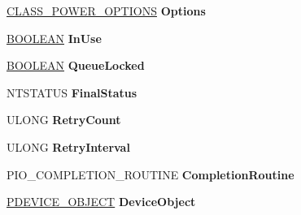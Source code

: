 \begin{DoxyCompactItemize}
\begin{tabbing}
\end{tabbing}\item 
\mbox{\label{struct___c_l_a_s_s___p_o_w_e_r___c_o_n_t_e_x_t_afaf59be046c6005396572ef83e4794f0}} 
\hyperlink{struct___c_l_a_s_s___p_o_w_e_r___o_p_t_i_o_n_s}{C\+L\+A\+S\+S\+\_\+\+P\+O\+W\+E\+R\+\_\+\+O\+P\+T\+I\+O\+NS} {\bfseries Options}
\item 
\mbox{\label{struct___c_l_a_s_s___p_o_w_e_r___c_o_n_t_e_x_t_acd952eab7209b941d56ceb97d26b5baf}} 
\hyperlink{_processor_bind_8h_a112e3146cb38b6ee95e64d85842e380a}{B\+O\+O\+L\+E\+AN} {\bfseries In\+Use}
\item 
\mbox{\label{struct___c_l_a_s_s___p_o_w_e_r___c_o_n_t_e_x_t_a098a4cbcfc9d5800363574cc6fcc1454}} 
\hyperlink{_processor_bind_8h_a112e3146cb38b6ee95e64d85842e380a}{B\+O\+O\+L\+E\+AN} {\bfseries Queue\+Locked}
\item 
\mbox{\label{struct___c_l_a_s_s___p_o_w_e_r___c_o_n_t_e_x_t_a44164694b69477785c0618208aaf9499}} 
N\+T\+S\+T\+A\+T\+US {\bfseries Final\+Status}
\item 
\mbox{\label{struct___c_l_a_s_s___p_o_w_e_r___c_o_n_t_e_x_t_ad751a7b058bc86027172581e7dd40cb5}} 
U\+L\+O\+NG {\bfseries Retry\+Count}
\item 
\mbox{\label{struct___c_l_a_s_s___p_o_w_e_r___c_o_n_t_e_x_t_ac1dde02502761b34bc40d90d5b324d00}} 
U\+L\+O\+NG {\bfseries Retry\+Interval}
\item 
\mbox{\label{struct___c_l_a_s_s___p_o_w_e_r___c_o_n_t_e_x_t_a44a602c36af1924702776b8987e7fa6c}} 
P\+I\+O\+\_\+\+C\+O\+M\+P\+L\+E\+T\+I\+O\+N\+\_\+\+R\+O\+U\+T\+I\+NE {\bfseries Completion\+Routine}
\item 
\mbox{\label{struct___c_l_a_s_s___p_o_w_e_r___c_o_n_t_e_x_t_a934b0876dc97ed0cc57691d51f5deb91}} 
\hyperlink{struct___d_e_v_i_c_e___o_b_j_e_c_t}{P\+D\+E\+V\+I\+C\+E\+\_\+\+O\+B\+J\+E\+CT} {\bfseries Device\+Object}

\end{DoxyCompactItemize}
